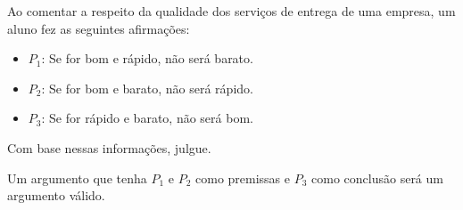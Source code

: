 \item
	Ao comentar a respeito da qualidade dos
serviços de entrega de uma empresa, um aluno fez as seguintes afirmações:
\begin{itemize}
	\item $P_1$: Se for bom e rápido, não será barato.
	\item $P_2$: Se for bom e barato, não será rápido.
	\item $P_3$: Se for rápido e barato, não será bom.
\end{itemize}
Com base nessas informações, julgue.

Um argumento que tenha $P_1$ e $P_2$ como
premissas e $P_3$ como conclusão será um
argumento válido.

